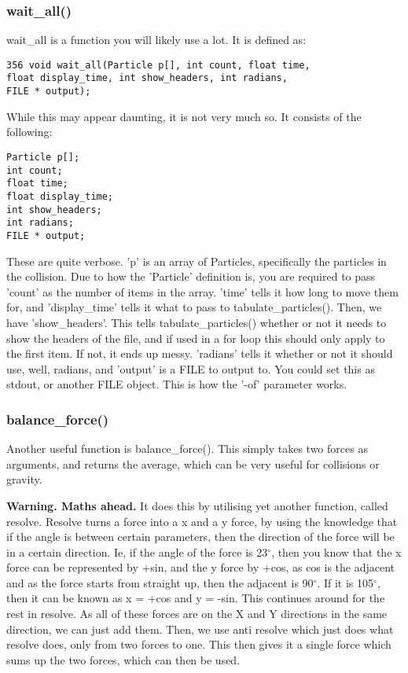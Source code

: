 \documentclass[11pt]{article}
\begin{document}
\subsubsection{wait\_all()}
wait\_all is a function you will likely use a lot. It is defined as:
\begin{lstlisting}
356 void wait_all(Particle p[], int count, float time, 
float display_time, int show_headers, int radians,
FILE * output);
\end{lstlisting}
While this may appear daunting, it is not very much so. It consists of the following:
\begin {lstlisting}
Particle p[];
int count;
float time;
float display_time;
int show_headers;
int radians;
FILE * output;
\end{lstlisting}
These are quite verbose. 'p' is an array of Particles, specifically the particles in the collision. Due to how the 'Particle' definition is, you are required to pass 'count' as the number of items in the array. 'time' tells it how long to move them for, and 'display\_time' tells it what to pass to tabulate\_particles(). \newline
Then, we have 'show\_headers'. This tells tabulate\_particles() whether or not it needs to show the headers of the file, and if used in a for loop this should only apply to the first item. If not, it ends up messy. 'radians' tells it whether or not it should use, well, radians, and 'output' is a FILE to output to. You could set this as stdout, or another FILE object. This is how the '-of' parameter works.\newline
\subsubsection{balance\_force()}
Another useful function is balance\_force(). This simply takes two forces as arguments, and returns the average, which can be very useful for collisions or gravity. \newline

\textbf{Warning. Maths ahead.}
It does this by utilising yet another function, called resolve. Resolve turns a force into a x and a y force, by using the knowledge that if the angle is between certain parameters, then the direction of the force will be in a certain direction. \newline
Ie, if the angle of the force is 23$^\circ$, then you know that the x force can be represented by +sin, and the y force by +cos, as cos is the adjacent and as the force starts from straight up, then the adjacent is 90$^\circ$. If it is 105$^\circ$, then it can be known as x = +cos and y = -sin. This continues around for the rest in resolve. \newline
As all of these forces are on the X and Y directions in the same direction, we can just add them. Then, we use anti resolve which just does what resolve does, only from two forces to one. This then gives it a single force which sums up the two forces, which can then be used.
\end{document}
